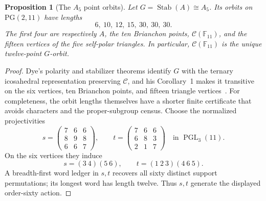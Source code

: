 \documentclass[11pt]{article}
\newtheorem{proposition}[theorem]{Proposition}
\theoremstyle{definition}
\theoremstyle{remark}
\newcommand{\PG}{\mathrm{PG}}
\newcommand{\F}{\mathbb{F}}
\newcommand{\cC}{\mathcal{C}}
\begin{document}
\begin{proposition}[The $A_5$ point orbits]
\label{prop:a5-point-orbits}
Let $G=\operatorname{Stab}(A)\cong A_5$. Its orbits on $\PG(2,11)$ have
lengths
\[
 6,\ 10,\ 12,\ 15,\ 30,\ 30,\ 30.
\]
The first four are respectively $A$, the ten Brianchon points,
$\cC(\F_{11})$, and the fifteen vertices of the five self-polar triangles.
In particular, $\cC(\F_{11})$ is the unique twelve-point $G$-orbit.
\end{proposition}

\begin{proof}
Dye's polarity and stabilizer theorems identify $G$ with the ternary
icosahedral representation preserving $\cC$, and his Corollary~1 makes it
transitive on the six vertices, ten Brianchon points, and fifteen triangle
vertices~\cite[Theorems~2--3 and Corollary~1, pp.~276--279]{Dye1991}.
For completeness, the orbit lengths themselves have a shorter finite
certificate that avoids characters and the proper-subgroup census.  Choose
the normalized projectivities
\[
 s=\begin{pmatrix}7&6&6\\8&9&8\\6&6&7\end{pmatrix},\qquad
 t=\begin{pmatrix}7&6&6\\6&8&3\\2&1&7\end{pmatrix}
 \quad\text{in }\operatorname{PGL}_3(11).
\]
On the six vertices they induce
\[
 s=(3\ 4)(5\ 6),\qquad t=(1\ 2\ 3)(4\ 6\ 5).
\]
A breadth-first word ledger in $s,t$ recovers all sixty distinct support
permutations; its longest word has length twelve.  Thus $s,t$ generate the
displayed order-sixty action.


\end{proof}
\end{document}
